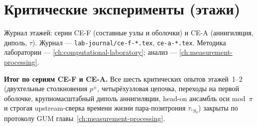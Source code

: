 \chapter{Критические эксперименты (этажи)}
\label{ch:critical-floors}

Журнал этажей: серии CE-F (составные узлы и оболочки) и CE-A (аннигиляция, диполь, $\tau$).
Журнал --- \texttt{lab-journal/ce-f-*.tex}, \texttt{ce-a-*.tex}.
Методика лаборатории --- \cref{ch:computational-laboratory}; анализ --- \cref{ch:measurement-processing}.



\medskip
\noindent\textbf{Итог по сериям CE-F и CE-A.}
Все шесть критических опытов этажей~1--2 (двухтельные столкновения $p^\pm$, четырёхузловая цепочка, переходы на первой оболочке, крупномасштабный диполь аннигиляции, head-on ансамбль оси mod~$\pi$ и строгая upstream-сверка времени жизни пара-позитрония $\tau_{^1S_0}$) закрыты по протоколу GUM главы~\ref{ch:measurement-processing}.
